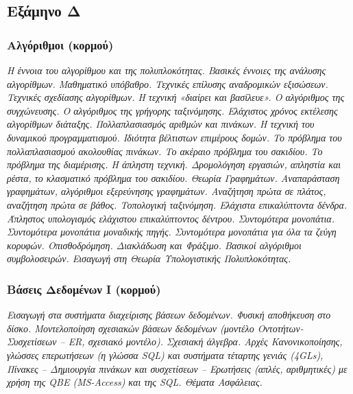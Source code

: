 \hypertarget{ux3b5ux3beux3acux3bcux3b7ux3bdux3bf-ux3b4}{%
\subsection{Εξάμηνο Δ}\label{ux3b5ux3beux3acux3bcux3b7ux3bdux3bf-ux3b4}}

\hypertarget{ux3b1ux3bbux3b3ux3ccux3c1ux3b9ux3b8ux3bcux3bfux3b9-ux3baux3bfux3c1ux3bcux3bfux3cd}{%
\subsubsection{Αλγόριθμοι
(κορμού)}\label{ux3b1ux3bbux3b3ux3ccux3c1ux3b9ux3b8ux3bcux3bfux3b9-ux3baux3bfux3c1ux3bcux3bfux3cd}}

\emph{Η έννοια του αλγορίθμου και της πολυπλοκότητας. Βασικές έννοιες
της ανάλυσης αλγορίθμων. Μαθηματικό υπόβαθρο. Τεχνικές επίλυσης
αναδρομικών εξισώσεων. Τεχνικές σχεδίασης αλγορίθμων. Η τεχνική «διαίρει
και βασίλευε». Ο αλγόριθμος της συγχώνευσης. Ο αλγόριθμος της γρήγορης
ταξινόμησης. Ελάχιστος χρόνος εκτέλεσης αλγορίθμων διάταξης.
Πολλαπλασιασμός αριθμών και πινάκων. Η τεχνική του δυναμικού
προγραμματισμού. Ιδιότητα βέλτιστων επιμέρους δομών. Το πρόβλημα του
πολλαπλασιασμού ακολουθίας πινάκων. Το ακέραιο πρόβλημα του σακιδίου. Το
πρόβλημα της διαμέρισης. Η άπληστη τεχνική. Δρομολόγηση εργασιών,
απληστία και ρέστα, το κλασματικό πρόβλημα του σακιδίου. Θεωρία
Γραφημάτων. Αναπαράσταση γραφημάτων, αλγόριθμοι εξερεύνησης γραφημάτων.
Αναζήτηση πρώτα σε πλάτος, αναζήτηση πρώτα σε βάθος. Τοπολογική
ταξινόμηση. Ελάχιστα επικαλύπτοντα δένδρα. Άπληστος υπολογισμός
ελάχιστου επικαλύπτοντος δέντρου. Συντομότερα μονοπάτια. Συντομότερα
μονοπάτια μοναδικής πηγής. Συντομότερα μονοπάτια για όλα τα ζεύγη
κορυφών. Οπισθοδρόμηση. Διακλάδωση και Φράξιμο. Βασικοί αλγόριθμοι
συμβολοσειρών. Εισαγωγή στη Θεωρία Υπολογιστικής Πολυπλοκότητας.}

\hypertarget{ux3b2ux3acux3c3ux3b5ux3b9ux3c2-ux3b4ux3b5ux3b4ux3bfux3bcux3adux3bdux3c9ux3bd-ux3b9-ux3baux3bfux3c1ux3bcux3bfux3cd}{%
\subsubsection{Βάσεις Δεδομένων Ι
(κορμού)}\label{ux3b2ux3acux3c3ux3b5ux3b9ux3c2-ux3b4ux3b5ux3b4ux3bfux3bcux3adux3bdux3c9ux3bd-ux3b9-ux3baux3bfux3c1ux3bcux3bfux3cd}}

\emph{Εισαγωγή στα συστήματα διαχείρισης βάσεων δεδομένων. Φυσική
αποθήκευση στο δίσκο. Μοντελοποίηση σχεσιακών βάσεων δεδομένων (μοντέλο
Οντοτήτων-Συσχετίσεων -- ER, σχεσιακό μοντέλο). Σχεσιακή άλγεβρα. Αρχές
Κανονικοποίησης, γλώσσες επερωτήσεων (η γλώσσα SQL) και συστήματα
τέταρτης γενιάς (4GLs), Πίνακες -- Δημιουργία πινάκων και συσχετίσεων --
Ερωτήσεις (απλές, αριθμητικές) με χρήση της QBE (MS-Access) και της SQL.
Θέματα Ασφάλειας.}


